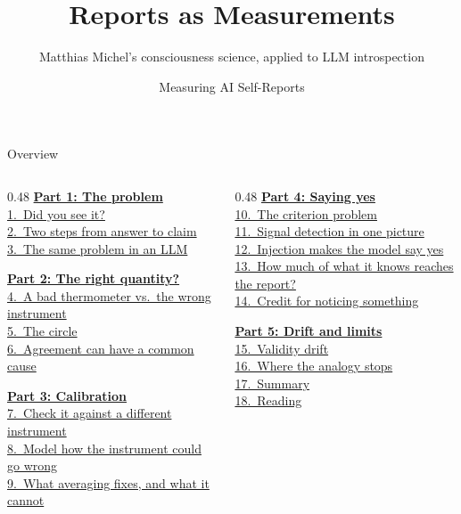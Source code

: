 \documentclass[aspectratio=169,11pt]{beamer}
\title{Reports as Measurements}
\subtitle{Matthias Michel's consciousness science, applied to LLM introspection}
\author{Measuring AI Self-Reports}
\date{}
\institute{}
\begin{document}
\maketitle

\begin{frame}{Overview}\footnotesize
\begin{columns}[T]
\begin{column}{0.48\textwidth}
\hyperlink{part1}{\textbf{Part 1: The problem}}\\[0.15em]
{\scriptsize%
\quad\hyperlink{flash}{1.~Did you see it?}\\%
\quad\hyperlink{twosteps}{2.~Two steps from answer to claim}\\%
\quad\hyperlink{llm}{3.~The same problem in an LLM}%
}\vspace{0.3em}

\hyperlink{part2}{\textbf{Part 2: The right quantity?}}\\[0.15em]
{\scriptsize%
\quad\hyperlink{thermo}{4.~A bad thermometer vs.\ the wrong instrument}\\%
\quad\hyperlink{circle}{5.~The circle}\\%
\quad\hyperlink{commoncause}{6.~Agreement can have a common cause}%
}\vspace{0.3em}

\hyperlink{part3}{\textbf{Part 3: Calibration}}\\[0.15em]
{\scriptsize%
\quad\hyperlink{concordance}{7.~Check it against a different instrument}\\%
\quad\hyperlink{modelcal}{8.~Model how the instrument could go wrong}\\%
\quad\hyperlink{averaging}{9.~What averaging fixes, and what it cannot}%
}
\end{column}
\begin{column}{0.48\textwidth}
\hyperlink{part4}{\textbf{Part 4: Saying yes}}\\[0.15em]
{\scriptsize%
\quad\hyperlink{scale}{10.~The criterion problem}\\%
\quad\hyperlink{sdt}{11.~Signal detection in one picture}\\%
\quad\hyperlink{yesbias}{12.~Injection makes the model say yes}\\%
\quad\hyperlink{metad}{13.~How much of what it knows reaches the report?}\\%
\quad\hyperlink{content}{14.~Credit for noticing something}%
}\vspace{0.3em}

\hyperlink{part5}{\textbf{Part 5: Drift and limits}}\\[0.15em]
{\scriptsize%
\quad\hyperlink{drift}{15.~Validity drift}\\%
\quad\hyperlink{limits}{16.~Where the analogy stops}\\%
\quad\hyperlink{summary}{17.~Summary}\\%
\quad\hyperlink{reading}{18.~Reading}%
}
\end{column}
\end{columns}
\end{frame}
\end{document}
